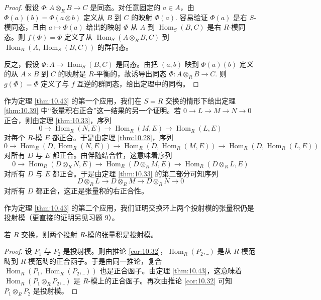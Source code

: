 \begin{proof}
假设 \(\Phi : A \otimes_R B \to C\) 是同态。对任意固定的 \(a \in A\)，由 \(\Phi(a)(b) = \Phi(a \otimes b)\) 定义从 \(B\) 到 \(C\) 的映射 \(\Phi(a)\). 容易验证 \(\Phi(a)\) 是右 \(S\)-模同态，且由 \(a \mapsto \Phi(a)\) 给出的映射 \(\Phi\) 从 \(A\) 到 \(\operatorname{Hom}_S(B, C)\) 是右 \(R\)-模同态。则 \(f(\Phi) = \Phi\) 定义了从 \(\operatorname{Hom}_S(A \otimes_R B, C)\) 到 \(\operatorname{Hom}_R(A, \operatorname{Hom}_S(B, C))\) 的群同态。

反之，假设 \(\Phi : A \to \operatorname{Hom}_S(B, C)\) 是同态。由把 \((a, b)\) 映到 \(\Phi(a)(b)\) 定义的从 \(A \times B\) 到 \(C\) 的映射是 \(R\)-平衡的，故诱导出同态 \(\Phi : A \otimes_R B \to C\). 则 \(g(\Phi) = \Phi\) 定义了与 \(f\) 互逆的群同态，给出定理中的同构。
\end{proof}

作为定理 \ref{thm:10.43} 的第一个应用，我们在 \(S = R\) 交换的情形下给出定理 \ref{thm:10.39} 中“张量积右正合”这一结果的另一个证明。若 \(0 \to L \to M \to N \to 0\) 正合，则由定理 \ref{thm:10.33}，序列
\[
0 \longrightarrow \operatorname{Hom}_R(N, E) \longrightarrow \operatorname{Hom}_R(M, E) \longrightarrow \operatorname{Hom}_R(L, E)
\]
对每个 \(R\)-模 \(E\) 都正合。于是由定理 \ref{thm:10.28}，序列
\[
0 \longrightarrow \operatorname{Hom}_R(D, \operatorname{Hom}_R(N, E)) \longrightarrow \operatorname{Hom}_R(D, \operatorname{Hom}_R(M, E)) \longrightarrow \operatorname{Hom}_R(D, \operatorname{Hom}_R(L, E))
\]
对所有 \(D\) 与 \(E\) 都正合。由伴随结合性，这意味着序列
\[
0 \longrightarrow \operatorname{Hom}_R(D \otimes_R N, E) \longrightarrow \operatorname{Hom}_R(D \otimes_R M, E) \longrightarrow \operatorname{Hom}_R(D \otimes_R L, E)
\]
对所有 \(D\) 与 \(E\) 都正合。于是由定理 \ref{thm:10.33} 的第二部分可知序列
\[
D \otimes_R L \longrightarrow D \otimes_R M \longrightarrow D \otimes_R N \longrightarrow 0
\]
对所有 \(D\) 都正合，这正是张量积的右正合性。

作为定理 \ref{thm:10.43} 的第二个应用，我们证明交换环上两个投射模的张量积仍是投射模（更直接的证明另见习题 9）。

\begin{corollary}\label{cor:10.44}
若 \(R\) 交换，则两个投射 \(R\)-模的张量积是投射模。
\end{corollary}

\begin{proof}
设 \(P_1\) 与 \(P_2\) 是投射模。则由推论 \ref{cor:10.32}，\(\operatorname{Hom}_R(P_2, \_)\) 是从 \(R\)-模范畴到 \(R\)-模范畴的正合函子。于是由同一推论，复合 \(\operatorname{Hom}_R(P_1, \operatorname{Hom}_R(P_2, \_))\) 也是正合函子。由定理 \ref{thm:10.43}，这意味着 \(\operatorname{Hom}_R(P_1 \otimes_R P_2, \_)\) 是 \(R\)-模上的正合函子。再次由推论 \ref{cor:10.32} 可知 \(P_1 \otimes_R P_2\) 是投射模。
\end{proof}

